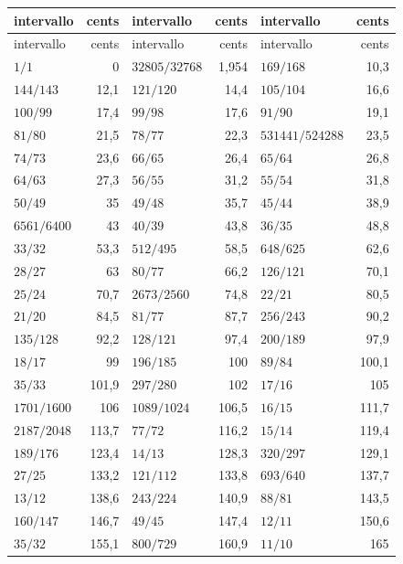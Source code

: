 \medskip
{\footnotesize
\setlength{\tabcolsep}{4pt}
\begin{longtable}{l r @{\qquad} l r @{\qquad} l r}
  \toprule
  intervallo & cents & intervallo & cents & intervallo & cents \\
  \midrule
  \endfirsthead
  \toprule
  intervallo & cents & intervallo & cents & intervallo & cents \\
  \midrule
  \endhead
  \midrule \endfoot
  \bottomrule \endlastfoot
$1/1$ & 0 & $32805/32768$ & 1{,}954 & $169/168$ & 10{,}3 \\
$144/143$ & 12{,}1 & $121/120$ & 14{,}4 & $105/104$ & 16{,}6 \\
$100/99$ & 17{,}4 & $99/98$ & 17{,}6 & $91/90$ & 19{,}1 \\
$81/80$ & 21{,}5 & $78/77$ & 22{,}3 & $531441/524288$ & 23{,}5 \\
$74/73$ & 23{,}6 & $66/65$ & 26{,}4 & $65/64$ & 26{,}8 \\
$64/63$ & 27{,}3 & $56/55$ & 31{,}2 & $55/54$ & 31{,}8 \\
$50/49$ & 35 & $49/48$ & 35{,}7 & $45/44$ & 38{,}9 \\
$6561/6400$ & 43 & $40/39$ & 43{,}8 & $36/35$ & 48{,}8 \\
$33/32$ & 53{,}3 & $512/495$ & 58{,}5 & $648/625$ & 62{,}6 \\
$28/27$ & 63 & $80/77$ & 66{,}2 & $126/121$ & 70{,}1 \\
$25/24$ & 70{,}7 & $2673/2560$ & 74{,}8 & $22/21$ & 80{,}5 \\
$21/20$ & 84{,}5 & $81/77$ & 87{,}7 & $256/243$ & 90{,}2 \\
$135/128$ & 92{,}2 & $128/121$ & 97{,}4 & $200/189$ & 97{,}9 \\
$18/17$ & 99 & $196/185$ & 100 & $89/84$ & 100{,}1 \\
$35/33$ & 101{,}9 & $297/280$ & 102 & $17/16$ & 105 \\
$1701/1600$ & 106 & $1089/1024$ & 106{,}5 & $16/15$ & 111{,}7 \\
$2187/2048$ & 113{,}7 & $77/72$ & 116{,}2 & $15/14$ & 119{,}4 \\
$189/176$ & 123{,}4 & $14/13$ & 128{,}3 & $320/297$ & 129{,}1 \\
$27/25$ & 133{,}2 & $121/112$ & 133{,}8 & $693/640$ & 137{,}7 \\
$13/12$ & 138{,}6 & $243/224$ & 140{,}9 & $88/81$ & 143{,}5 \\
$160/147$ & 146{,}7 & $49/45$ & 147{,}4 & $12/11$ & 150{,}6 \\
$35/32$ & 155{,}1 & $800/729$ & 160{,}9 & $11/10$ & 165 \\

\end{longtable}}
